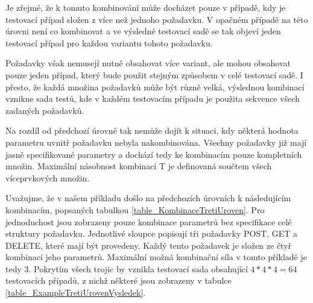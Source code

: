 Je zřejmé, že k tomuto kombinování může docházet pouze v případě, kdy je testovací případ složen z více než jednoho požadavku. V opačném případě na této úrovni není co kombinovat a ve výsledné testovací sadě se tak objeví jeden testovací případ pro každou variantu tohoto požadavku.

Požadavky však nemusejí nutně obsahovat více variant, ale mohou obsahovat pouze jeden případ, který bude použit stejným způsobem v celé testovací sadě. I přesto, že každá množina požadavků může být různě velká, výslednou kombinací vznikne sada testů, kde v každém testovacím případu je použita sekvence všech zadaných požadavků.

Na rozdíl od předchozí úrovně tak nemůže dojít k situaci, kdy některá hodnota parametru uvnitř požadavku nebyla nakombinována. Všechny požadavky již mají jasně specifikované parametry a dochází tedy ke kombinacím pouze kompletních množin. Maximální násobnost kombinací T je definovaná součtem všech víceprvkových množin. 

Uvažujme, že v našem příkladu došlo na předchozích úrovních k následujícím kombinacím, popsaných tabulkou \ref{table_KombinaceTretiUroven}. Pro jednoduchost jsou zobrazeny pouze kombinace parametrů bez specifikace celé struktury požadavku. Jednotlivé sloupce popisují tři požadavky POST, GET a DELETE, které mají být provedeny. Každý tento požadavek je složen ze čtyř kombinací jeho parametrů. Maximální možná kombinační síla v tomto příkladě je tedy $3$. Pokrytím všech trojic by vznikla testovací sada obsahující $4*4*4=64$ testovacích případů, z nichž některé jsou zobrazeny v tabulce \ref{table_ExampleTretiUrovenVysledek}.


